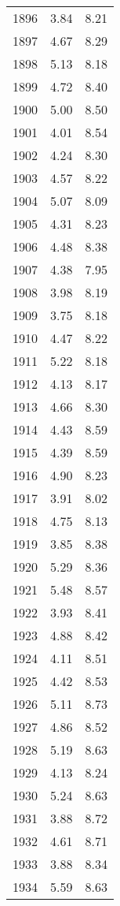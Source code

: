 \begin{tabular}{lrr}
1896 &    3.84 &    8.21 \\
1897 &    4.67 &    8.29 \\
1898 &    5.13 &    8.18 \\
1899 &    4.72 &    8.40 \\
1900 &    5.00 &    8.50 \\
1901 &    4.01 &    8.54 \\
1902 &    4.24 &    8.30 \\
1903 &    4.57 &    8.22 \\
1904 &    5.07 &    8.09 \\
1905 &    4.31 &    8.23 \\
1906 &    4.48 &    8.38 \\
1907 &    4.38 &    7.95 \\
1908 &    3.98 &    8.19 \\
1909 &    3.75 &    8.18 \\
1910 &    4.47 &    8.22 \\
1911 &    5.22 &    8.18 \\
1912 &    4.13 &    8.17 \\
1913 &    4.66 &    8.30 \\
1914 &    4.43 &    8.59 \\
1915 &    4.39 &    8.59 \\
1916 &    4.90 &    8.23 \\
1917 &    3.91 &    8.02 \\
1918 &    4.75 &    8.13 \\
1919 &    3.85 &    8.38 \\
1920 &    5.29 &    8.36 \\
1921 &    5.48 &    8.57 \\
1922 &    3.93 &    8.41 \\
1923 &    4.88 &    8.42 \\
1924 &    4.11 &    8.51 \\
1925 &    4.42 &    8.53 \\
1926 &    5.11 &    8.73 \\
1927 &    4.86 &    8.52 \\
1928 &    5.19 &    8.63 \\
1929 &    4.13 &    8.24 \\
1930 &    5.24 &    8.63 \\
1931 &    3.88 &    8.72 \\
1932 &    4.61 &    8.71 \\
1933 &    3.88 &    8.34 \\
1934 &    5.59 &    8.63 \\

\end{tabular}
